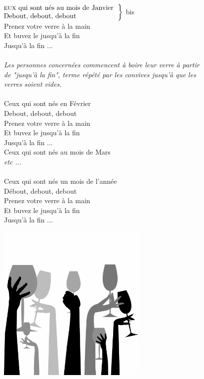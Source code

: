 
\\ 
$\left.\begin{tabular}{l}
\hspace{-0.4cm}
\textsc{eux} qui sont nés au mois de Janvier
\\
\hspace{-0.4cm}
Debout, debout, debout
\end{tabular}\right\rbrace$ bis
\\Prenez votre verre à la main
\\Et buvez le jusqu'à la fin
\\Jusqu'à la fin ...
\\\\\textit{Les personnes concernées commencent à boire leur verre à partir
\\de "jusqu'à la fin", terme répété par les convives jusqu'à que les
\\verres soient vides.}
\\\\Ceux qui sont nés en Février
\\Debout, debout, debout
\\Prenez votre verre à la main
\\Et buvez le jusqu'à la fin
\\Jusqu'à la fin ...
\\Ceux qui sont nés au mois de Mars
\\\textit{etc ...}
\\\\Ceux qui sont nés un mois de l'année
\\Débout, debout, debout
\\Prenez votre verre à la main
\\Et buvez le jusqu'à la fin
\\Jusqu'à la fin ...
\begin{center}
\includegraphics[width=0.54\textwidth]{images/ceux_qui_sont_nes.jpg}
\end{center}

\breakpage